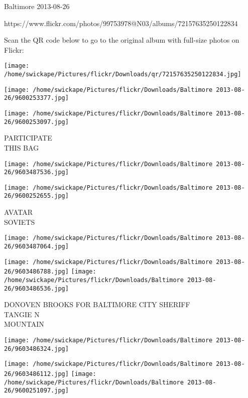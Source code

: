\documentclass[10pt,letterpaper]{article}
\begin{document}
Baltimore 2013-08-26

https://www.flickr.com/photos/99753978@N03/albums/72157635250122834

Scan the QR code below to go to the original album with full-size photos on Flickr:

\texttt{[image: /home/swickape/Pictures/flickr/Downloads/qr/72157635250122834.jpg]}
\pagebreak

\texttt{[image: /home/swickape/Pictures/flickr/Downloads/Baltimore 2013-08-26/9600253377.jpg]}

\vspace{0.25in}
\texttt{[image: /home/swickape/Pictures/flickr/Downloads/Baltimore 2013-08-26/9600253097.jpg]}

PARTICIPATE\\
THIS BAG\\
\pagebreak

\texttt{[image: /home/swickape/Pictures/flickr/Downloads/Baltimore 2013-08-26/9603487536.jpg]}

\vspace{0.25in}
\texttt{[image: /home/swickape/Pictures/flickr/Downloads/Baltimore 2013-08-26/9600252655.jpg]}

AVATAR\\
SOVIETS\\
\pagebreak

\texttt{[image: /home/swickape/Pictures/flickr/Downloads/Baltimore 2013-08-26/9603487064.jpg]}

\vspace{0.25in}
\texttt{[image: /home/swickape/Pictures/flickr/Downloads/Baltimore 2013-08-26/9603486788.jpg]}
\texttt{[image: /home/swickape/Pictures/flickr/Downloads/Baltimore 2013-08-26/9603486536.jpg]}

DONOVEN BROOKS FOR BALTIMORE CITY SHERIFF\\
TANGIE N\\
MOUNTAIN\\
\pagebreak

\texttt{[image: /home/swickape/Pictures/flickr/Downloads/Baltimore 2013-08-26/9603486324.jpg]}

\vspace{0.25in}
\texttt{[image: /home/swickape/Pictures/flickr/Downloads/Baltimore 2013-08-26/9603486112.jpg]}
\texttt{[image: /home/swickape/Pictures/flickr/Downloads/Baltimore 2013-08-26/9600251097.jpg]}
\end{document}

